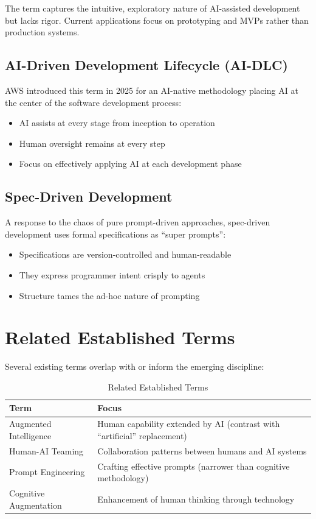 The term captures the intuitive, exploratory nature of AI-assisted development but lacks rigor. Current applications focus on prototyping and MVPs rather than production systems.

\subsection{AI-Driven Development Lifecycle (AI-DLC)}

AWS introduced this term in 2025 for an AI-native methodology placing AI at the center of the software development process:

\begin{itemize}
    \item AI assists at every stage from inception to operation
    \item Human oversight remains at every step
    \item Focus on effectively applying AI at each development phase
\end{itemize}

\subsection{Spec-Driven Development}

A response to the chaos of pure prompt-driven approaches, spec-driven development uses formal specifications as ``super prompts'':

\begin{itemize}
    \item Specifications are version-controlled and human-readable
    \item They express programmer intent crisply to agents
    \item Structure tames the ad-hoc nature of prompting
\end{itemize}

\section{Related Established Terms}

Several existing terms overlap with or inform the emerging discipline:

\begin{table}[H]
\centering
\begin{tabular}{lp{7cm}}
\toprule
\textbf{Term} & \textbf{Focus} \\
\midrule
Augmented Intelligence & Human capability extended by AI (contrast with ``artificial'' replacement) \\
Human-AI Teaming & Collaboration patterns between humans and AI systems \\
Prompt Engineering & Crafting effective prompts (narrower than cognitive methodology) \\
Cognitive Augmentation & Enhancement of human thinking through technology \\
\bottomrule
\end{tabular}
\caption{Related Established Terms}
\end{table}


